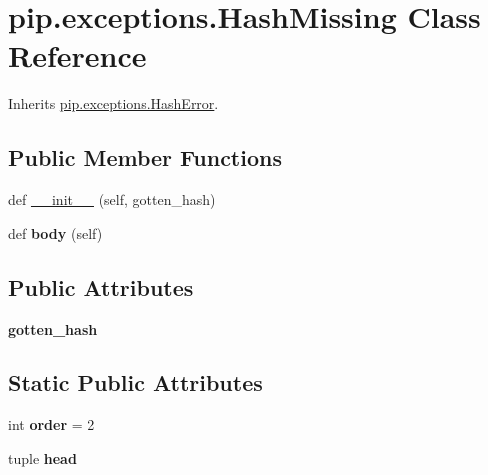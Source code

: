 \hypertarget{classpip_1_1exceptions_1_1_hash_missing}{}\section{pip.\+exceptions.\+Hash\+Missing Class Reference}
\label{classpip_1_1exceptions_1_1_hash_missing}


Inherits \hyperlink{classpip_1_1exceptions_1_1_hash_error}{pip.\+exceptions.\+Hash\+Error}.

\subsection*{Public Member Functions}
\begin{DoxyCompactItemize}
\item 
def \hyperlink{classpip_1_1exceptions_1_1_hash_missing_a317e8e9bca79a2c1a07e7dc3ff717870}{\+\_\+\+\_\+init\+\_\+\+\_\+} (self, gotten\+\_\+hash)
\item 
\mbox{\label{classpip_1_1exceptions_1_1_hash_missing_aa4fe1f671a4b060124d88330a70e113f}} 
def {\bfseries body} (self)
\end{DoxyCompactItemize}
\subsection*{Public Attributes}
\begin{DoxyCompactItemize}
\item 
\mbox{\label{classpip_1_1exceptions_1_1_hash_missing_a13504a1a3e5fd2ea70c84a441e1a3d00}} 
{\bfseries gotten\+\_\+hash}
\end{DoxyCompactItemize}
\subsection*{Static Public Attributes}
\begin{DoxyCompactItemize}
\item 
\mbox{\label{classpip_1_1exceptions_1_1_hash_missing_a7afd5f5cc60a1911ea123b57de51cb94}} 
int {\bfseries order} = 2
\item 
tuple {\bfseries head}
\end{DoxyCompactItemize}


